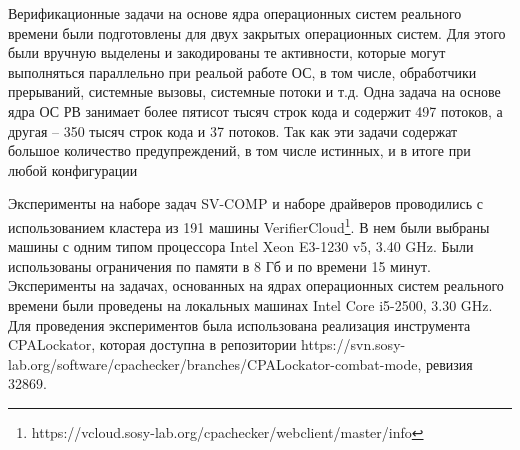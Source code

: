 Верификационные задачи на основе ядра операционных систем реального времени были подготовлены для двух закрытых операционных систем.
Для этого были вручную выделены и закодированы те активности, которые могут выполняться параллельно при реальой работе ОС, в том числе, обработчики прерываний, системные вызовы, системные потоки и т.д.
Одна задача на основе ядра ОС РВ занимает более пятисот тысяч строк кода и содержит 497 потоков, а другая -- 350 тысяч строк кода и 37 потоков.
Так как эти задачи содержат большое количество предупреждений, в том числе истинных, и в итоге при любой конфигурации

Эксперименты на наборе задач SV-COMP и наборе драйверов проводились с использованием кластера из 191 машины VerifierCloud\footnote{https://vcloud.sosy-lab.org/cpachecker/webclient/master/info}.
В нем были выбраны машины с одним типом процессора Intel Xeon E3-1230 v5, 3.40 GHz.
Были использованы ограничения по памяти в 8 Гб и по времени 15 минут.
Эксперименты на задачах, основанных на ядрах операционных систем реального времени были проведены на локальных машинах Intel Core i5-2500, 3.30 GHz.
Для проведения экспериментов была использована реализация инструмента CPALockator, которая доступна в репозитории https://svn.sosy-lab.org/software/cpachecker/branches/CPALockator-combat-mode, ревизия 32869.

